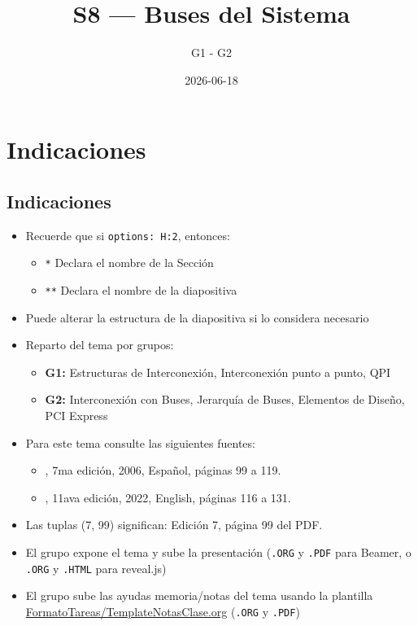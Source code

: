 \documentclass[presentation]{beamer}
\author{G1 - G2}
\date{2026-06-18}
\title{S8 — Buses del Sistema}
\begin{document}
\maketitle
\tableofcontents


\section{Indicaciones}
\label{sec:org89cfee9}
\subsection{Indicaciones}
\label{sec:org3fa0817}
\begin{itemize}
\item Recuerde que si \texttt{options: H:2}, entonces:
\begin{itemize}
\item \texttt{*} Declara el nombre de la Sección
\item \texttt{**} Declara el nombre de la diapositiva
\end{itemize}
\item Puede alterar la estructura de la diapositiva si lo considera necesario
\item Reparto del tema por grupos:
\begin{itemize}
\item \textbf{G1:} Estructuras de Interconexión, Interconexión punto a punto, QPI
\item \textbf{G2:} Interconexión con Buses, Jerarquía de Buses, Elementos de Diseño, PCI Express
\end{itemize}
\item Para este tema consulte las siguientes fuentes:
\begin{itemize}
\item \textcite{stallings2006esp}, 7ma edición, 2006, Español, páginas 99 a 119.
\item \textcite{stallings2022computer}, 11ava edición, 2022, English, páginas 116 a 131.
\end{itemize}
\item Las tuplas (7, 99) significan: Edición 7, página 99 del PDF.
\item El grupo expone el tema y sube la presentación (\texttt{.ORG} y \texttt{.PDF} para Beamer, o \texttt{.ORG} y \texttt{.HTML} para reveal.js)
\item El grupo sube las ayudas memoria/notas del tema usando la plantilla \url{FormatoTareas/TemplateNotasClase.org} (\texttt{.ORG} y \texttt{.PDF})
\end{itemize}
\end{document}
